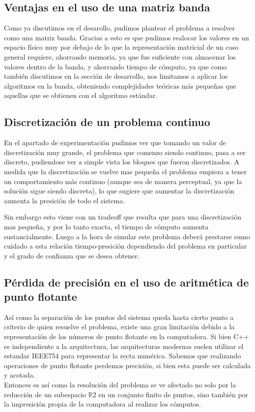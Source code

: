 \subsection{Ventajas en el uso de una matriz banda}

Como ya discutimos en el desarollo, pudimos plantear el problema a resolver como una matriz banda. Gracias a esto es que pudimos realocar los valores en un espacio físico muy por debajo de lo que la representación matricial de un caso general requiere, ahorrando memoria, ya que fue suficiente con almacenar los valores dentro de la banda, y ahorrando tiempo de cómputo, ya que como también discutimos en la sección de desarrollo, nos limitamos a aplicar los algoritmos en la banda, obteniendo complejidades teóricas más pequeñas que aquellas que se obtienen con el algoritmo estándar.

\subsection{Discretización de un problema continuo}

En el apartado de experimentación pudimos ver que tomando un valor de discretización muy grande, el problema que comenzo siendo continuo, pasa a ser discreto, pudiendose ver a simple vista los bloques que fueron discretizados. A medida que la discretización se vuelve mas pequeña el problema empieza a tener un comportamiento más continuo (aunque sea de manera perceptual, ya que la solución sigue siendo discreta), lo que sugiere que aumentar la discretización aumenta la presición de todo el sistema.

Sin embargo esto viene con un tradeoff que resulta que para una discretización mas pequeña, y por lo tanto exacta, el tiempo de cómputo aumenta sustancialmente. Luego a la hora de simular este problema deberá prestarse sumo cuidado a esta relación tiempo-presición dependiendo del problema en particular y el grado de confianza que se desea obtener.

\subsection{P\'erdida de precisión en el uso de aritm\'etica de punto flotante}

Así como la separación de los puntos del sistema queda hasta cierto punto a criterio de quien resuelve el problema, existe una gran limitación debido	a la representación de los números de punto flotante en la computadora. Si bien C++ es independiente a la arquitectura, las arquitecturas modernas suelen utilizar el estandar IEEE754 para representar la recta numérica. Sabemos que realizando operaciones de punto flotante perdemos precisión, si bien esta puede ser calculada y acotada. 
\\
Entonces es así como la resolución del problema se ve afectado no solo por la reducción de un subespacio $\mathbb{R}2$ en un conjunto finito de puntos, sino también por la impresición propia de la computadora al realizar los cómputos.


